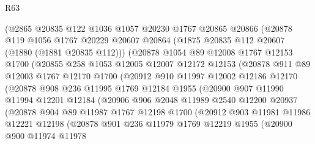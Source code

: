 \begin{lexlean}{R63}
\begin{coremodule}
          (@2865
            @20835
            @122
            @1036
            @1057
            @20230
            @1767
            @20865
            @20866
            (@20878
              @119
              @1056
              @1767
              @20229
              @20607
              @20864
              (@1875 @20835 @112 @20607 (@1880 (@1881 @20835 @112)))
              (@20878
                @1054
                @89
                @12008
                @1767
                @12153
                @1700
                (@20855
                  @258
                  @1053
                  @12005
                  @12007
                  @12172
                  @12153
                  (@20878
                    @911
                    @89
                    @12003
                    @1767
                    @12170
                    @1700
                    (@20912
                      @910
                      @11997
                      @12002
                      @12186
                      @12170
                      (@20878
                        @908
                        @236
                        @11995
                        @1769
                        @12184
                        @1955
                        (@20900
                          @907
                          @11990
                          @11994
                          @12201
                          @12184
                          (@20906
                            @906
                            @2048
                            @11989
                            @2540
                            @12200
                            @20937
                            (@20878
                              @904
                              @89
                              @11987
                              @1767
                              @12198
                              @1700
                              (@20912
                                @903
                                @11981
                                @11986
                                @12221
                                @12198
                                (@20878
                                  @901
                                  @236
                                  @11979
                                  @1769
                                  @12219
                                  @1955
                                  (@20900
                                    @900
                                    @11974
                                    @11978

\end{coremodule}
\end{lexlean}

